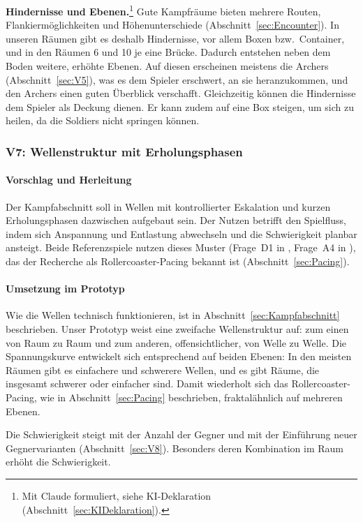 \documentclass[../Main.tex]{subfiles}
\begin{document}
\textbf{Hindernisse und Ebenen.}\footnote{Mit Claude formuliert, siehe KI-Deklaration (Abschnitt~\ref{sec:KIDeklaration}).} Gute Kampfräume bieten mehrere Routen, Flankiermöglichkeiten und Höhenunterschiede (Abschnitt~\ref{sec:Encounter}). In unseren Räumen gibt es deshalb Hindernisse, vor allem Boxen bzw.\ Container, und in den Räumen 6 und 10 je eine Brücke. Dadurch entstehen neben dem Boden weitere, erhöhte Ebenen. Auf diesen erscheinen meistens die Archers (Abschnitt~\ref{sec:V5}), was es dem Spieler erschwert, an sie heranzukommen, und den Archers einen guten Überblick verschafft. Gleichzeitig können die Hindernisse dem Spieler als Deckung dienen. Er kann zudem auf eine Box steigen, um sich zu heilen, da die Soldiers nicht springen können.

\subsubsection{V7: Wellenstruktur mit Erholungsphasen} \label{sec:V7}

\paragraph{Vorschlag und Herleitung}
Der Kampfabschnitt soll in Wellen mit kontrollierter Eskalation und kurzen Erholungsphasen dazwischen aufgebaut sein. Der Nutzen betrifft den Spielfluss, indem sich Anspannung und Entlastung abwechseln und die Schwierigkeit planbar ansteigt. Beide Referenzspiele nutzen dieses Muster (Frage~D1 in , Frage~A4 in ), das der Recherche als Rollercoaster-Pacing bekannt ist (Abschnitt~\ref{sec:Pacing}).

\paragraph{Umsetzung im Prototyp}
Wie die Wellen technisch funktionieren, ist in Abschnitt~\ref{sec:Kampfabschnitt} beschrieben. Unser Prototyp weist eine zweifache Wellenstruktur auf: zum einen von Raum zu Raum und zum anderen, offensichtlicher, von Welle zu Welle. Die Spannungskurve entwickelt sich entsprechend auf beiden Ebenen: In den meisten Räumen gibt es einfachere und schwerere Wellen, und es gibt Räume, die insgesamt schwerer oder einfacher sind. Damit wiederholt sich das Rollercoaster-Pacing, wie in Abschnitt~\ref{sec:Pacing} beschrieben, fraktalähnlich auf mehreren Ebenen.

Die Schwierigkeit steigt mit der Anzahl der Gegner und mit der Einführung neuer Gegnervarianten (Abschnitt~\ref{sec:V8}). Besonders deren Kombination im Raum erhöht die Schwierigkeit.
\end{document}
